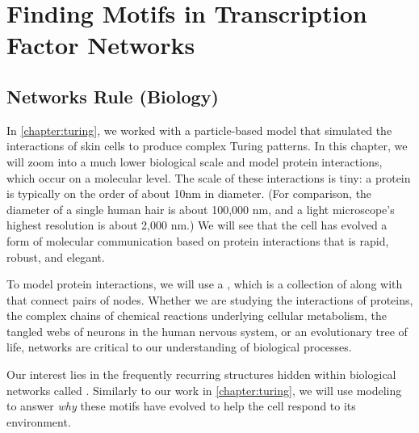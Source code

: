 \chapter[Finding Motifs in Transcription Factor Networks]{Finding Motifs in Transcription Factor Networks}
\label{chapter:motifs}
\renewcommand{\chaptertitle}{Finding Motifs in Transcription Factor Networks}


\FloatBarrier

\section{Networks Rule (Biology)}
\label{sec:introduction}

In \autoref{chapter:turing}, we worked with a particle-based model that simulated the interactions of skin cells to produce complex Turing patterns. In this chapter, we will zoom into a much lower biological scale and model protein interactions, which occur on a molecular level. The scale of these interactions is tiny: a protein is typically on the order of about 10nm in diameter. (For comparison, the diameter of a single human hair is about 100,000 nm, and a light microscope's highest resolution is about 2,000 nm.) We will see that the cell has evolved a form of molecular communication based on protein interactions that is rapid, robust, and elegant.

To model protein interactions, we will use a  , which is a collection of  along with  that connect pairs of nodes. Whether we are studying the interactions of proteins, the complex chains of chemical reactions underlying cellular metabolism, the tangled webs of neurons in the human nervous system, or an evolutionary tree of life, networks are critical to our understanding of biological processes.

Our interest lies in the frequently recurring structures hidden within biological networks called . Similarly to our work in \autoref{chapter:turing}, we will use modeling to answer \textit{why} these motifs have evolved to help the cell respond to its environment.

